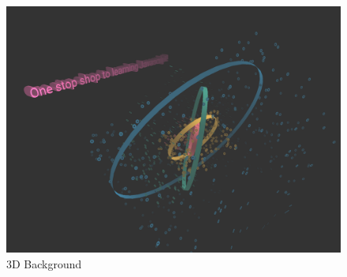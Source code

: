 \documentclass[a4paper]{article}
\begin{document}
\begin{figure}[h!]
  \centering
  \includegraphics[width=0.75\linewidth]{images/3d_background.png}
  \caption{3D Background}
  \label{fig:3d_background}
\end{figure}
\end{document}
